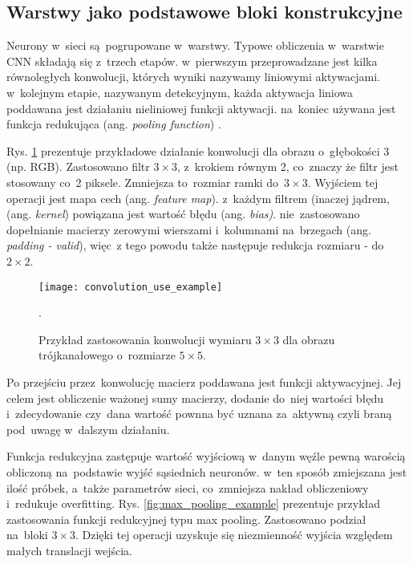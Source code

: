 \subsection{Warstwy jako podstawowe bloki konstrukcyjne}

Neurony w~sieci są~pogrupowane w~warstwy. Typowe obliczenia w~warstwie CNN składają się z~trzech etapów. w~pierwszym przeprowadzane jest kilka równoległych konwolucji, których wyniki nazywamy liniowymi aktywacjami. w~kolejnym etapie, nazywanym detekcyjnym, każda aktywacja liniowa poddawana jest działaniu nieliniowej funkcji aktywacji. na~koniec używana jest funkcja redukująca (ang. \textit{pooling function}) \cite{deep_learning}.

{\parindent0pt %
Rys. \ref{fig:convolution_example} prezentuje przykładowe działanie konwolucji dla obrazu o~głębokości 3 (np. RGB). Zastosowano filtr $3\times3$, z~krokiem równym 2, co~znaczy że filtr jest stosowany co~2 piksele. Zmniejsza to~rozmiar ramki do~$3\times3$. Wyjściem tej operacji jest mapa cech (ang. \textit{feature map}). z~każdym filtrem (inaczej jądrem, (ang. \textit{kernel}) powiązana jest wartość błędu (ang. \textit{bias)}. nie~zastosowano dopełnianie macierzy zerowymi wierszami i~kolumnami na~brzegach (ang. \textit{padding - valid}), więc~z tego powodu także następuje redukcja rozmiaru - do~$2\times2$. 

\begin{figure}[h!]
	\centering
	\centering
		\texttt{[image: convolution\_use\_example]}	
	\caption{Przykład zastosowania konwolucji wymiaru $3\times3$ dla obrazu trójkanałowego o~rozmiarze $5\times5$.}.
	\label{fig:convolution_example}
\end{figure}

Po przejściu przez~konwolucję macierz poddawana jest funkcji aktywacyjnej. Jej celem jest obliczenie ważonej sumy macierzy, dodanie do~niej wartości błędu i~zdecydowanie czy~dana wartość pownna być uznana za~aktywną czyli braną pod~uwagę w~dalszym działaniu.

Funkcja redukcyjna zastępuje wartość wyjściową w~danym węźle pewną warością obliczoną na~podstawie wyjść sąsiednich neuronów. w~ten sposób zmiejszana jest ilość próbek, a~także parametrów sieci, co~zmniejsza nakład obliczeniowy i~redukuje overfitting. Rys. \ref{fig:max_pooling_example} prezentuje przykład zastosowania funkcji redukcyjnej typu max pooling. Zastosowano podział na~bloki $3\times3$. Dzięki tej operacji uzyskuje się niezmienność wyjścia względem małych translacji wejścia.

}
